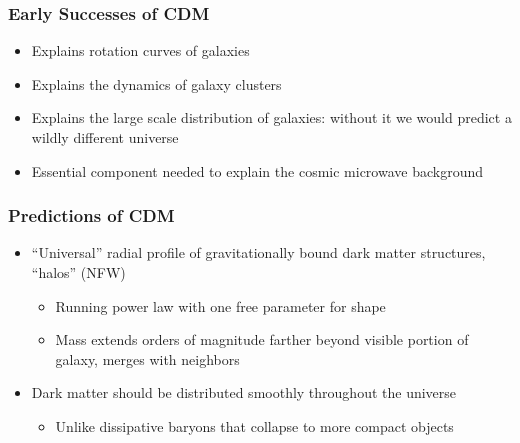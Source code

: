 \documentclass{beamer}
\begin{document}
\frame
{
    \frametitle{Early Successes of CDM}

 
    \begin{itemize}

        \item Explains rotation curves of galaxies

        \item Explains the dynamics of galaxy clusters

        \item Explains the large scale distribution of galaxies: without it we
          would predict a wildly different universe

        \item Essential component needed to explain the cosmic microwave
          background

    \end{itemize}

}

\frame
{
    \frametitle{Predictions of CDM}

 
    \begin{itemize}

        \item  ``Universal'' radial profile of gravitationally bound dark matter
            structures, ``halos'' (NFW)
            \begin{itemize}
                \item Running power law with one free parameter for shape
                \item Mass extends orders of magnitude farther beyond visible portion of galaxy,
                    merges with neighbors
            \end{itemize}


        \item  Dark matter should be distributed smoothly throughout the
            universe
            \begin{itemize}
                \item Unlike dissipative baryons that collapse to more compact objects
            \end{itemize}

    \end{itemize}

}
\end{document}
